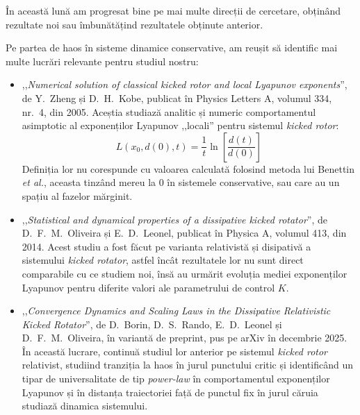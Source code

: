 
\makereportpreamble

În această lună am progresat bine pe mai multe direcții de cercetare, obținând rezultate noi sau îmbunătățind rezultatele obținute anterior.

Pe partea de haos în sisteme dinamice conservative, am reușit să identific mai multe lucrări relevante pentru studiul nostru:
\begin{itemize}
    \item ,,\textit{Numerical solution of classical kicked rotor and local Lyapunov exponents}'', de Y.~Zheng și D.~H.~Kobe, publicat în Physics Letters A, volumul 334, nr.~4, din 2005. Aceștia studiază analitic și numeric comportamentul asimptotic al exponenților Lyapunov ,,locali'' pentru sistemul \textit{kicked rotor}:
    \[
        L\left(x_0, d(0), t\right) = \frac{1}{t} \ln\left[\frac{d(t)}{d(0)}\right]
    \]
    Definiția lor nu corespunde cu valoarea calculată folosind metoda lui Benettin \textit{et al.}, aceasta tinzând mereu la \(0\) în sistemele conservative, sau care au un spațiu al fazelor mărginit.

    \item ,,\textit{Statistical and dynamical properties of a dissipative kicked rotator}'', de D.~F.~M.~Oliveira și E.~D.~Leonel, publicat în Physica A, volumul 413, din 2014. Acest studiu a fost făcut pe varianta relativistă și disipativă a sistemului \textit{kicked rotator}, astfel încât rezultatele lor nu sunt direct comparabile cu ce studiem noi, însă au urmărit evoluția mediei exponenților Lyapunov pentru diferite valori ale parametrului de control \(K\).

    \item ,,\textit{Convergence Dynamics and Scaling Laws in the Dissipative Relativistic Kicked Rotator}'', de D.~Borin, D.~S.~Rando, E.~D.~Leonel și D.~F.~M.~Oliveira, în variantă de preprint, pus pe arXiv în decembrie 2025. În această lucrare, continuă studiul lor anterior pe sistemul \textit{kicked rotor} relativist, studiind tranziția la haos în jurul punctului critic și identificând un tipar de universalitate de tip \textit{power-law} în comportamentul exponenților Lyapunov și în distanța traiectoriei față de punctul fix în jurul căruia studiază dinamica sistemului.
\end{itemize}

